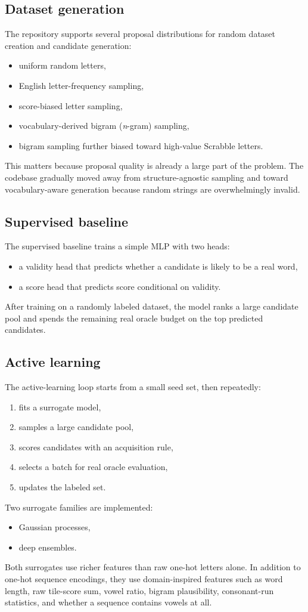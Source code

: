 \documentclass[10pt]{article}
\begin{document}
\subsection{Dataset generation}
The repository supports several proposal distributions for random dataset creation and candidate generation:
\begin{itemize}
    \item uniform random letters,
    \item English letter-frequency sampling,
    \item score-biased letter sampling,
    \item vocabulary-derived bigram (\emph{n}-gram) sampling,
    \item bigram sampling further biased toward high-value Scrabble letters.
\end{itemize}
This matters because proposal quality is already a large part of the problem. The codebase gradually moved away from structure-agnostic sampling and toward vocabulary-aware generation because random strings are overwhelmingly invalid.

\subsection{Supervised baseline}
The supervised baseline trains a simple MLP with two heads:
\begin{itemize}
    \item a validity head that predicts whether a candidate is likely to be a real word,
    \item a score head that predicts score conditional on validity.
\end{itemize}
After training on a randomly labeled dataset, the model ranks a large candidate pool and spends the remaining real oracle budget on the top predicted candidates.

\subsection{Active learning}
The active-learning loop starts from a small seed set, then repeatedly:
\begin{enumerate}
    \item fits a surrogate model,
    \item samples a large candidate pool,
    \item scores candidates with an acquisition rule,
    \item selects a batch for real oracle evaluation,
    \item updates the labeled set.
\end{enumerate}
Two surrogate families are implemented:
\begin{itemize}
    \item Gaussian processes,
    \item deep ensembles.
\end{itemize}
Both surrogates use richer features than raw one-hot letters alone. In addition to one-hot sequence encodings, they use domain-inspired features such as word length, raw tile-score sum, vowel ratio, bigram plausibility, consonant-run statistics, and whether a sequence contains vowels at all.
\end{document}
